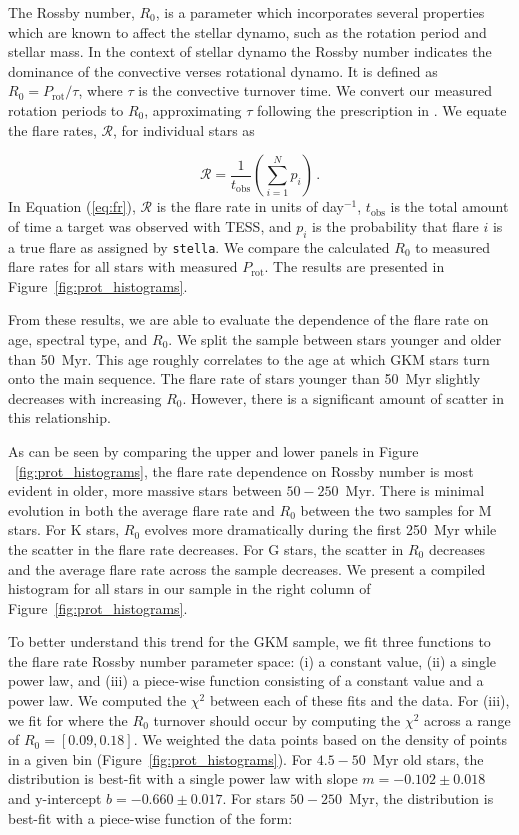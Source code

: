 \documentclass[twocolumn, linenumbers]{aastex631}
\begin{document}
The Rossby number, $R_0$, is a parameter which incorporates  several properties which are known to affect the stellar dynamo, such as the rotation period and stellar mass. In the context of
stellar dynamo the Rossby number indicates the dominance of the convective verses rotational dynamo. It is defined as $R_0 = P_\textrm{rot}/\tau$, where $\tau$ is the convective turnover
time. We convert our measured rotation periods to $R_0$,  approximating $\tau$ following the prescription in \cite{wright11}. We
equate the flare rates, $\mathcal{R}$, for individual stars as

\begin{equation}\label{eq:fr}
  \mathcal{R} = \frac{1}{t_\textrm{obs}} \left( \sum_{i=1}^{N} p_i \right)\,.
\end{equation}
In Equation (\ref{eq:fr}), $\mathcal{R}$ is the flare rate in units of day$^{-1}$, $t_\textrm{obs}$ is the total amount of time a target was observed with TESS, and $p_i$ is the probability
that flare $i$ is a true flare as assigned by \texttt{stella}. We compare the calculated $R_0$ to measured flare rates for all stars with measured $P_\textrm{rot}$. The results are presented
in Figure~\ref{fig:prot_histograms}.


From these results, we are able to evaluate the dependence of the flare rate on age, spectral type,  and $R_0$. We split the sample between stars younger and older than 50~Myr. This age roughly
correlates to the age at which GKM stars turn onto the main sequence. The flare rate of stars younger than 50~Myr slightly decreases with increasing $R_0$. However, there is a significant amount
of scatter in this relationship.

As can be seen by comparing the upper and  lower panels in Figure ~\ref{fig:prot_histograms}, the flare rate dependence on Rossby number is most evident in older, more massive stars  between
$50 - 250$~Myr. There is minimal evolution in both the average flare rate and $R_0$ between the two samples for M stars. For K stars,  $R_0$ evolves more dramatically during the first 250~Myr
while the scatter in the flare rate decreases. For G stars, the scatter in $R_0$ decreases and the average flare rate across the sample decreases. We present a compiled histogram for all stars
in our sample in the right column of Figure~\ref{fig:prot_histograms}.

To better understand this trend for the GKM sample, we fit three functions to the flare rate Rossby number parameter space: (i) a constant value, (ii) a single power law, and (iii) a piece-wise
function consisting of a constant value and a power law.  We computed the $\chi^2$ between each of these fits and the data. For (iii), we fit for where the $R_0$ turnover should occur by
computing the $\chi^2$ across a range of $R_0 = [0.09, 0.18]$. We weighted the data points based on the density of points in a given bin (Figure~\ref{fig:prot_histograms}). For  $4.5 - 50$~Myr
old stars, the distribution is best-fit with a single power law with slope $m = -0.102 \pm 0.018$ and y-intercept $b = -0.660 \pm 0.017$. For stars $50 - 250$~Myr, the distribution is best-fit
with a piece-wise function of the form:
\end{document}
